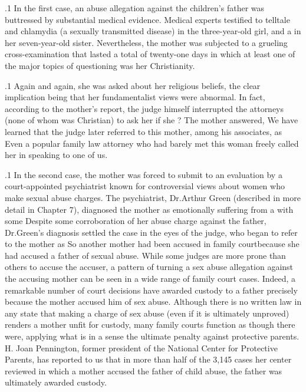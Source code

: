 \documentclass[11pt, twoside]{article}
\begin{document}
{\p.1{%
In the first case, an abuse allegation against the children’s father was
buttressed by substantial medical evidence. Medical experts testified to
telltale  and chlamydia (a sexually transmitted disease)
in the three-year-old girl, and a  in her seven-year-old sister. Nevertheless,
the mother was subjected to a grueling cross-examination that lasted a
total of twenty-one days in which at least one of the major topics of
questioning was her  Christianity.
}%

\p.1{%
Again and again, she was asked about her religious beliefs, the clear
implication being that her fundamentalist views were abnormal. In fact,
according to the mother’s report, the judge himself interrupted the attorneys (none of whom was Christian) to ask her if she ? The mother answered, 
We have learned that the judge later referred to this mother, among
his associates, as  Even a popular family law attorney who
had barely met this woman freely called her  in speaking to one
of us.
}%

\p.1{%
In the second case, the mother was forced to submit to an evaluation
by a court-appointed psychiatrist known for controversial views about
women who make sexual abuse charges. The psychiatrist, Dr.\@ Arthur
Green (described in more detail in Chapter 7), diagnosed the mother as
emotionally  suffering from a 
with some  Despite some corroboration of her abuse
charge against the father, Dr.\@ Green’s diagnosis settled the case in the
eyes of the judge, who began to refer to the mother as 
So another mother had been accused in family court\mdash{}because she had
accused a father of sexual abuse.
While some judges are more prone than others to accuse the accuser,
a pattern of turning a sex abuse allegation against the accusing mother
can be seen in a wide range of family court cases. Indeed, a remarkable
number of court decisions have awarded custody to a father precisely
because the mother accused him of sex abuse. Although there is no
written law in any state that making a charge of sex abuse (even if it
is ultimately unproved) renders a mother unfit for custody, many family
courts function as though there were, applying what is in a sense the ultimate penalty against protective parents. H. Joan Pennington, former
president of the National Center for Protective Parents, has reported to
us that in more than half of the 3,145 cases her center reviewed in which
a mother accused the father of child abuse, the father was ultimately
awarded custody.
}%


}
\end{document}
